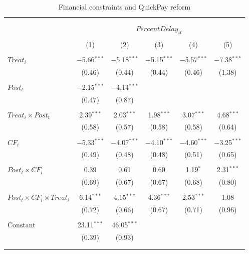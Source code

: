 \documentclass[
]{article}
\begin{document}
\begin{table}[H] \centering 
  \caption{Financial constraints and QuickPay reform} 
  \label{} 
\small 
\begin{tabular}{@{\extracolsep{-2pt}}lccccc} 
\\[-1.8ex]\hline 
\hline \\[-1.8ex] 
\\[-1.8ex] & \multicolumn{5}{c}{$PercentDelay_{it}$  } \\ 
\\[-1.8ex] & (1) & (2) & (3) & (4) & (5)\\ 
\hline \\[-1.8ex] 
 $Treat_i$ & $-$5.66$^{***}$ & $-$5.18$^{***}$ & $-$5.15$^{***}$ & $-$5.57$^{***}$ & $-$7.38$^{***}$ \\ 
  & (0.46) & (0.44) & (0.44) & (0.46) & (1.38) \\ 
  & & & & & \\ 
 $Post_t$ & $-$2.15$^{***}$ & $-$4.14$^{***}$ &  &  &  \\ 
  & (0.47) & (0.87) &  &  &  \\ 
  & & & & & \\ 
 $Treat_i \times Post_t$ & 2.39$^{***}$ & 2.03$^{***}$ & 1.98$^{***}$ & 3.07$^{***}$ & 4.68$^{***}$ \\ 
  & (0.58) & (0.57) & (0.58) & (0.58) & (0.64) \\ 
  & & & & & \\ 
 $CF_i$ & $-$5.33$^{***}$ & $-$4.07$^{***}$ & $-$4.10$^{***}$ & $-$4.60$^{***}$ & $-$3.25$^{***}$ \\ 
  & (0.49) & (0.48) & (0.48) & (0.51) & (0.65) \\ 
  & & & & & \\ 
 $Post_t \times CF_i$ & 0.39 & 0.61 & 0.60 & 1.19$^{*}$ & 2.31$^{***}$ \\ 
  & (0.69) & (0.67) & (0.67) & (0.68) & (0.80) \\ 
  & & & & & \\ 
 $Post_t \times CF_i \times Treat_i$ & 6.14$^{***}$ & 4.15$^{***}$ & 4.36$^{***}$ & 2.53$^{***}$ & 1.08 \\ 
  & (0.72) & (0.66) & (0.67) & (0.71) & (0.96) \\ 
  & & & & & \\ 
 Constant & 23.11$^{***}$ & 46.05$^{***}$ &  &  &  \\ 
  & (0.39) & (0.93) &  &  &  \\ 
  & & & & & \\ 
\hline \\[-1.8ex] 

\end{tabular}
\end{table}
\end{document}
